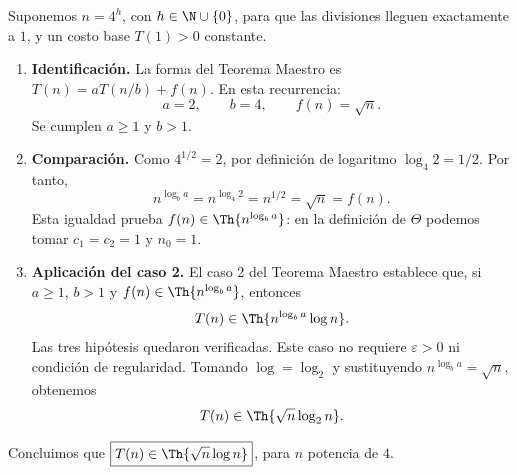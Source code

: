 
Suponemos $n=4^h$, con $h\in\N\cup\{0\}$, para que las divisiones lleguen exactamente a $1$, y un costo base $T(1)>0$ constante.

\begin{enumerate}
\item \textbf{Identificación.} La forma del Teorema Maestro es $T(n)=aT(n/b)+f(n)$. En esta recurrencia:
\[
a=2,\qquad b=4,\qquad f(n)=\sqrt{n}.
\]
Se cumplen $a\ge1$ y $b>1$.

\item \textbf{Comparación.} Como $4^{1/2}=2$, por definición de logaritmo $\log_4 2=1/2$. Por tanto,
\[
n^{\log_b a}=n^{\log_4 2}=n^{1/2}=\sqrt{n}=f(n).
\]
Esta igualdad prueba $f(n)\in\Th{n^{\log_b a}}$: en la definición de $\Theta$ podemos tomar $c_1=c_2=1$ y $n_0=1$.

\item \textbf{Aplicación del caso 2.} El caso 2 del Teorema Maestro establece que, si $a\ge1$, $b>1$ y $f(n)\in\Th{n^{\log_b a}}$, entonces
\[
T(n)\in\Th{n^{\log_b a}\log n}.
\]
Las tres hipótesis quedaron verificadas. Este caso no requiere $\varepsilon>0$ ni condición de regularidad. Tomando $\log=\log_2$ y sustituyendo $n^{\log_b a}=\sqrt{n}$, obtenemos
\[
T(n)\in\Th{\sqrt{n}\log_2 n}.
\]
\end{enumerate}

Concluimos que $\boxed{T(n)\in\Th{\sqrt{n}\log n}}$, para $n$ potencia de $4$.
\fin
